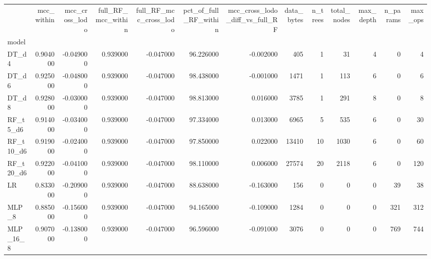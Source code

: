 \begin{tabular}{lrrrrrrrrrrrr}
\toprule
 & mcc_within & mcc_cross_lodo & full_RF_mcc_within & full_RF_mcc_cross_lodo & pct_of_full_RF_within & mcc_cross_lodo_diff_vs_full_RF & data_bytes & n_trees & total_nodes & max_depth & n_params & max_ops \\
model &  &  &  &  &  &  &  &  &  &  &  &  \\
\midrule
DT_d4 & 0.904000 & -0.049000 & 0.939000 & -0.047000 & 96.226000 & -0.002000 & 405 & 1 & 31 & 4 & 0 & 4 \\
DT_d6 & 0.925000 & -0.048000 & 0.939000 & -0.047000 & 98.438000 & -0.001000 & 1471 & 1 & 113 & 6 & 0 & 6 \\
DT_d8 & 0.928000 & -0.030000 & 0.939000 & -0.047000 & 98.813000 & 0.016000 & 3785 & 1 & 291 & 8 & 0 & 8 \\
RF_t5_d6 & 0.914000 & -0.034000 & 0.939000 & -0.047000 & 97.334000 & 0.013000 & 6965 & 5 & 535 & 6 & 0 & 30 \\
RF_t10_d6 & 0.919000 & -0.024000 & 0.939000 & -0.047000 & 97.850000 & 0.022000 & 13410 & 10 & 1030 & 6 & 0 & 60 \\
RF_t20_d6 & 0.922000 & -0.041000 & 0.939000 & -0.047000 & 98.110000 & 0.006000 & 27574 & 20 & 2118 & 6 & 0 & 120 \\
LR & 0.833000 & -0.209000 & 0.939000 & -0.047000 & 88.638000 & -0.163000 & 156 & 0 & 0 & 0 & 39 & 38 \\
MLP_8 & 0.885000 & -0.156000 & 0.939000 & -0.047000 & 94.165000 & -0.109000 & 1284 & 0 & 0 & 0 & 321 & 312 \\
MLP_16_8 & 0.907000 & -0.138000 & 0.939000 & -0.047000 & 96.596000 & -0.091000 & 3076 & 0 & 0 & 0 & 769 & 744 \\
\bottomrule
\end{tabular}
